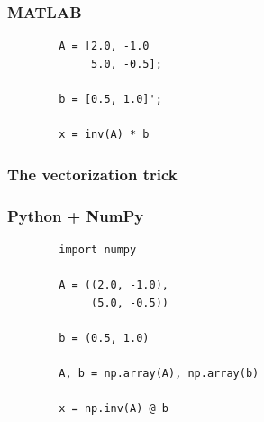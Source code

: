 \documentclass[
    xcolor={svgnames,dvipsnames},
    hyperref={colorlinks, citecolor=DeepPink4, linkcolor=DarkRed, urlcolor=DarkBlue}
    ]{beamer}  %
\newcommand{\1}{\mathbbm 1}
\begin{document}
\begin{frame}[fragile]
    \frametitle{MATLAB}

    \begin{verbatim}
        A = [2.0, -1.0
             5.0, -0.5];

        b = [0.5, 1.0]';

        x = inv(A) * b
    \end{verbatim}


\end{frame}



\begin{frame}
    \frametitle{The vectorization trick}
    
    \begin{figure}
       \begin{center} %
       \end{center}
    \end{figure}

    
\end{frame}


\begin{frame}[fragile]
    \frametitle{Python + NumPy}


    \begin{verbatim}
        import numpy 

        A = ((2.0, -1.0),
             (5.0, -0.5))

        b = (0.5, 1.0)

        A, b = np.array(A), np.array(b)

        x = np.inv(A) @ b
    \end{verbatim}

\end{frame}
\end{document}
